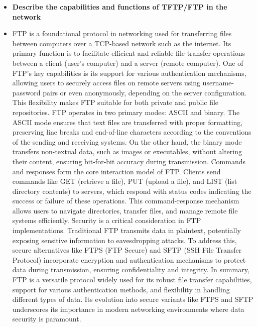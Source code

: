 \documentclass{article}
\begin{document}
\begin{itemize}
  \item \textbf{Describe the capabilities and functions of TFTP/FTP in the network}
  	\item[] FTP is a foundational protocol in networking used for transferring files between computers over a TCP-based network such as the internet. Its primary function is to facilitate efficient and reliable file transfer operations between a client (user's computer) and a server (remote computer). One of FTP's key capabilities is its support for various authentication mechanisms, allowing users to securely access files on remote servers using username-password pairs or even anonymously, depending on the server configuration. This flexibility makes FTP suitable for both private and public file repositories. FTP operates in two primary modes: ASCII and binary. The ASCII mode ensures that text files are transferred with proper formatting, preserving line breaks and end-of-line characters according to the conventions of the sending and receiving systems. On the other hand, the binary mode transfers non-textual data, such as images or executables, without altering their content, ensuring bit-for-bit accuracy during transmission. Commands and responses form the core interaction model of FTP. Clients send commands like GET (retrieve a file), PUT (upload a file), and LIST (list directory contents) to servers, which respond with status codes indicating the success or failure of these operations. This command-response mechanism allows users to navigate directories, transfer files, and manage remote file systems efficiently. Security is a critical consideration in FTP implementations. Traditional FTP transmits data in plaintext, potentially exposing sensitive information to eavesdropping attacks. To address this, secure alternatives like FTPS (FTP Secure) and SFTP (SSH File Transfer Protocol) incorporate encryption and authentication mechanisms to protect data during transmission, ensuring confidentiality and integrity. In summary, FTP is a versatile protocol widely used for its robust file transfer capabilities, support for various authentication methods, and flexibility in handling different types of data. Its evolution into secure variants like FTPS and SFTP underscores its importance in modern networking environments where data security is paramount.

\end{itemize}
\end{document}
